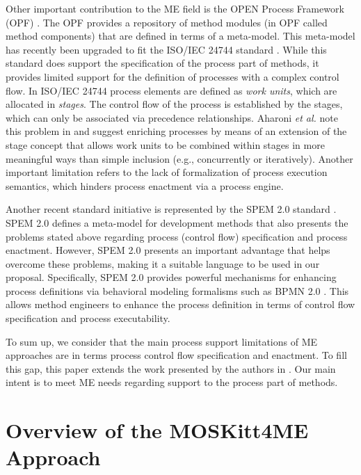 \documentclass[runningheads,a4paper]{llncs}
\begin{document}
Other important contribution to the ME field is the OPEN Process
Framework (OPF) \cite{Firesmith02}. The OPF provides a repository of method
modules (in OPF called method components) that are defined in terms of a
meta-model. This meta-model has recently been upgraded to fit the ISO/IEC 24744
standard \cite{iso24744}. While this standard does support the specification of
the process part of methods, it provides limited support for the definition of
processes with a complex control flow. In ISO/IEC 24744 process elements are
defined as \textit{work units}, which are allocated in \textit{stages}. The
control flow of the process is established by the stages, which can only be
associated via precedence relationships. Aharoni \textit{et al.} note this
problem in \cite{Aharoni08} and suggest enriching processes by means of an
extension of the stage concept that allows work units to be combined within
stages in more meaningful ways than simple inclusion (e.g., concurrently or
iteratively). Another important limitation refers to the lack of formalization
of process execution semantics, which hinders process enactment via a
process engine.

Another recent standard initiative is represented by the SPEM 2.0 standard
\cite{spem}. SPEM 2.0 defines a meta-model for development methods that
also presents the problems stated above regarding process (control flow)
specification and process enactment. However, SPEM 2.0 presents an important
advantage that helps overcome these problems, making it a suitable language
to be used in our proposal. Specifically, SPEM 2.0 provides powerful mechanisms for
enhancing process definitions via behavioral modeling formalisms such as BPMN
2.0 \cite{bpmn}. This allows method engineers to enhance the process
definition in terms of control flow specification and process
executability.

To sum up, we consider that the main process support limitations of ME
approaches are in terms process control flow specification and enactment. To
fill this gap, this paper extends the work presented by the authors in
\cite{Cervera10,Cervera11}. Our main intent is to meet ME needs regarding
support to the process part of methods.

\section{Overview of the MOSKitt4ME Approach}
\label{SectionOverview}
\end{document}
